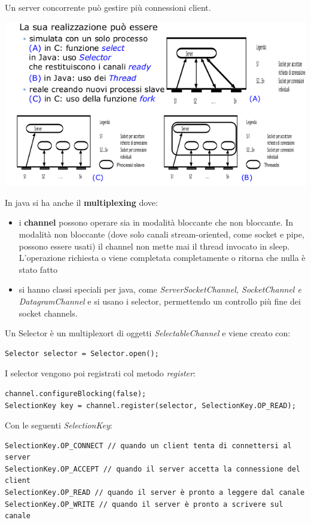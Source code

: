 \documentclass[a4paper,12pt, oneside]{book}
\begin{document}
Un server concorrente può gestire più connessioni client.
\begin{center}
	\includegraphics[scale=2.7]{img/conc.png}
\end{center}
In java si ha anche il \textbf{multiplexing} dove:
\begin{itemize}
	\item i \textbf{channel} possono operare sia in modalità bloccante che non bloccante. In modalità non bloccante (dove solo canali stream-oriented, come socket e pipe, possono essere usati) il channel non mette mai il thread invocato in sleep. L'operazione richiesta o viene completata completamente o ritorna che nulla è stato fatto
	\item si hanno classi speciali per java, come \textit{ServerSocketChannel, SocketChannel e
		      DatagramChannel} e si usano i selector, permettendo un controllo più fine dei socket channels.
\end{itemize}
Un Selector è un multiplexort di oggetti \textit{SelectableChannel} e viene creato con:
\begin{verbatim}
Selector selector = Selector.open();
\end{verbatim}
I selector vengono poi registrati col metodo \textit{register}:
\begin{verbatim}
channel.configureBlocking(false);
SelectionKey key = channel.register(selector, SelectionKey.OP_READ);
\end{verbatim}
Con le seguenti \textit{SelectionKey}:
\begin{verbatim}
SelectionKey.OP_CONNECT // quando un client tenta di connettersi al server
SelectionKey.OP_ACCEPT // quando il server accetta la connessione del client
SelectionKey.OP_READ // quando il server è pronto a leggere dal canale
SelectionKey.OP_WRITE // quando il server è pronto a scrivere sul canale
\end{verbatim}
\end{document}
